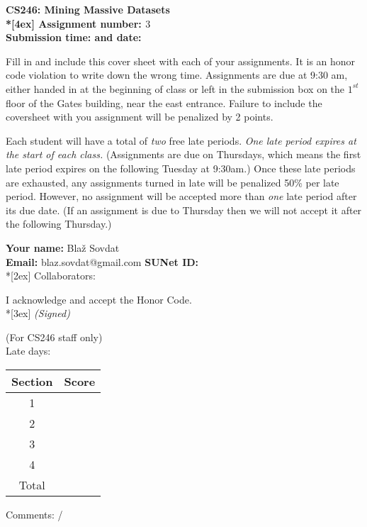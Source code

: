 \begin{titlepage}
	\thispagestyle{empty}
	\parindent 0pt
	\vfill

	\begin{center}
	\LARGE{\bf \textsf{CS246: Mining Massive Datasets} \\*[4ex]
	\Large{
	Assignment number: $3$\hrulefill \\
	Submission time: \hrulefill \quad and date: \hrulefill } }
	\end{center}

	\vfill

	Fill in and include this cover sheet with each of your assignments. It is an honor code violation to write down the wrong time. Assignments are due at 9:30 am, either handed in at the beginning of class or left in the submission box on the $1^{st}$ floor of the Gates building, near the east entrance. Failure to include the coversheet with you assignment will be penalized by 2 points.

	Each student will have a total of {\em two} free late periods. {\em One late period expires at the start of each class.} (Assignments are due on Thursdays, which means the first late period expires on the following Tuesday at 9:30am.) Once these late periods are exhausted, any assignments turned in late will be penalized 50\% per late period. However, no assignment will be accepted more than {\em one} late period after its due date. (If an assignment is due to Thursday then we will not accept it after the following Thursday.) 

	\vfill
	\bigskip
	\vfill

	{\Large
	\textbf{Your name:} Bla\v{z} Sovdat\hrulefill \\
	\textbf{Email:} blaz.sovdat@gmail.com\underline{\hspace*{7cm}} \textbf{SUNet ID:} \hrulefill\\*[2ex] }
	Collaborators:\hrulefill
	\vfill

	I acknowledge and accept the Honor Code.\\*[3ex]
	\bigskip
	\textit{(Signed)}\hrulefill

	\vfill
	\vfill

	\begin{center}
	\normalsize{(For CS246 staff only)\\
	\bigskip
	Late days:  }
	\end{center}


	\begin{center}
	\linespread{1.3}
	\large
	\begin{tabular}{|c|r|}\hline
	Section & \hspace*{1.5cm} Score \\ \hline \hline
	1 &  \\ \hline
	2 &  \\ \hline
	3 &  \\ \hline
	4 &  \\ \hline
	\hline
	Total & \hspace*{1cm} \\ \hline
	\end{tabular}
	\end{center}
	Comments: /
\end{titlepage}
